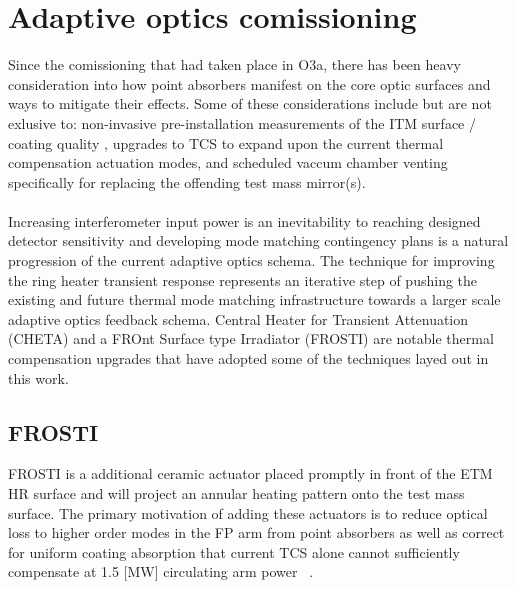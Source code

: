
\section{Adaptive optics comissioning}
Since the comissioning that had taken place in O3a, there has been heavy consideration into how point absorbers manifest on the core optic surfaces and ways to mitigate their effects. Some of these considerations include but are not exlusive to: non-invasive pre-installation measurements of the ITM surface / coating quality \cite{dcc:paNSFupdate2022}, upgrades to TCS to expand upon the current thermal compensation actuation modes, and scheduled vaccum chamber venting specifically for replacing the offending test mass mirror(s). 
\\
\\
Increasing interferometer input power is an inevitability to reaching designed detector sensitivity and developing mode matching contingency plans is a natural progression of the current adaptive optics schema. The technique for improving the ring heater transient response represents an iterative step of pushing the existing and future thermal mode matching infrastructure towards a larger scale adaptive optics feedback schema. Central Heater for Transient Attenuation (CHETA) and a FROnt Surface type Irradiator (FROSTI) are notable thermal compensation upgrades that have adopted some of the techniques layed out in this work.

\subsection*{FROSTI} 
FROSTI is a additional ceramic actuator placed promptly in front of the ETM HR surface and will project an annular heating pattern onto the test mass surface. The primary motivation of adding these actuators is to reduce optical loss to higher order modes in the FP arm from point absorbers as well as correct for uniform coating absorption that current TCS alone cannot sufficiently compensate at 1.5 [MW] circulating arm power ~\cite{frosti}.

